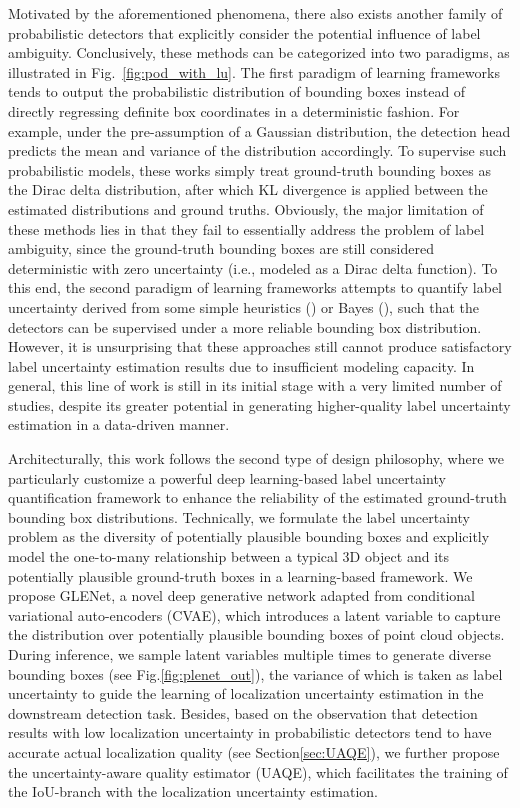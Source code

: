 \documentclass[twocolumn]{svjour3}
\begin{document}
Motivated by the aforementioned phenomena, there also exists another family of probabilistic detectors that explicitly consider the potential influence of label ambiguity. Conclusively, these methods can be categorized into two paradigms, as illustrated in Fig.~\ref{fig:pod_with_lu}. The first paradigm of learning frameworks \citep{bbr,LaserNet,f1,f2} tends to output the probabilistic distribution of bounding boxes instead of directly regressing definite box coordinates in a deterministic fashion. For example, under the pre-assumption of a Gaussian distribution, the detection head predicts the mean and variance of the distribution accordingly. To supervise such probabilistic models, these works simply treat ground-truth bounding boxes as the Dirac delta distribution, after which KL divergence is applied between the estimated distributions and ground truths. Obviously, the major limitation of these methods lies in that they fail to essentially address the problem of label ambiguity, since the ground-truth bounding boxes are still considered deterministic with zero uncertainty (i.e., modeled as a Dirac delta function). To this end, the second paradigm of learning frameworks attempts to quantify label uncertainty derived from some simple heuristics (\cite{meyer2020learning}) or Bayes (\cite{feng_iros}), such that the detectors can be supervised under a more reliable bounding box distribution. However, it is unsurprising that these approaches still cannot produce satisfactory label uncertainty estimation results due to insufficient modeling capacity. In general, this line of work is still in its initial stage with a very limited number of studies, despite its greater potential in generating higher-quality label uncertainty estimation in a data-driven manner.

Architecturally, this work follows the second type of design philosophy, where we particularly customize a powerful deep learning-based label uncertainty quantification framework to enhance the reliability of the estimated ground-truth bounding box distributions. Technically, we formulate the label uncertainty problem as the diversity of potentially plausible bounding boxes and explicitly model the one-to-many relationship between a typical 3D object and its potentially plausible ground-truth boxes in a learning-based framework. We propose GLENet, a novel deep generative network adapted from conditional variational auto-encoders (CVAE), which introduces a latent variable to capture the distribution over potentially plausible bounding boxes of point cloud objects. During inference, we sample latent variables multiple times to generate diverse bounding boxes (see Fig.\ref{fig:plenet_out}), the variance of which is taken as label uncertainty to guide the learning of localization uncertainty estimation in the downstream detection task. Besides, based on the observation that detection results with low localization uncertainty in probabilistic detectors tend to have accurate actual localization quality (see Section\ref{sec:UAQE}), we further propose the uncertainty-aware quality estimator (UAQE), which facilitates the training of the IoU-branch with the localization uncertainty estimation.
\end{document}
